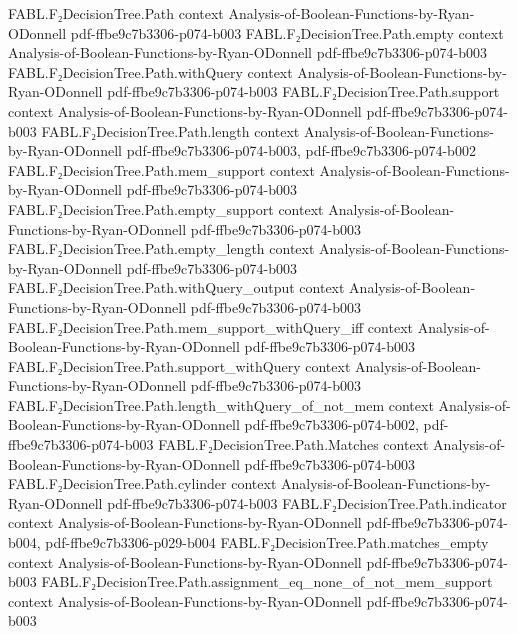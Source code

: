 \begin{theorem}
\proofstep
  {FABL.F₂DecisionTree.Path}
  {context}
  {Analysis-of-Boolean-Functions-by-Ryan-ODonnell}
  {pdf-ffbe9c7b3306-p074-b003}
\proofstep
  {FABL.F₂DecisionTree.Path.empty}
  {context}
  {Analysis-of-Boolean-Functions-by-Ryan-ODonnell}
  {pdf-ffbe9c7b3306-p074-b003}
\proofstep
  {FABL.F₂DecisionTree.Path.withQuery}
  {context}
  {Analysis-of-Boolean-Functions-by-Ryan-ODonnell}
  {pdf-ffbe9c7b3306-p074-b003}
\proofstep
  {FABL.F₂DecisionTree.Path.support}
  {context}
  {Analysis-of-Boolean-Functions-by-Ryan-ODonnell}
  {pdf-ffbe9c7b3306-p074-b003}
\proofstep
  {FABL.F₂DecisionTree.Path.length}
  {context}
  {Analysis-of-Boolean-Functions-by-Ryan-ODonnell}
  {pdf-ffbe9c7b3306-p074-b003,
    pdf-ffbe9c7b3306-p074-b002}
\proofstep
  {FABL.F₂DecisionTree.Path.mem_support}
  {context}
  {Analysis-of-Boolean-Functions-by-Ryan-ODonnell}
  {pdf-ffbe9c7b3306-p074-b003}
\proofstep
  {FABL.F₂DecisionTree.Path.empty_support}
  {context}
  {Analysis-of-Boolean-Functions-by-Ryan-ODonnell}
  {pdf-ffbe9c7b3306-p074-b003}
\proofstep
  {FABL.F₂DecisionTree.Path.empty_length}
  {context}
  {Analysis-of-Boolean-Functions-by-Ryan-ODonnell}
  {pdf-ffbe9c7b3306-p074-b003}
\proofstep
  {FABL.F₂DecisionTree.Path.withQuery_output}
  {context}
  {Analysis-of-Boolean-Functions-by-Ryan-ODonnell}
  {pdf-ffbe9c7b3306-p074-b003}
\proofstep
  {FABL.F₂DecisionTree.Path.mem_support_withQuery_iff}
  {context}
  {Analysis-of-Boolean-Functions-by-Ryan-ODonnell}
  {pdf-ffbe9c7b3306-p074-b003}
\proofstep
  {FABL.F₂DecisionTree.Path.support_withQuery}
  {context}
  {Analysis-of-Boolean-Functions-by-Ryan-ODonnell}
  {pdf-ffbe9c7b3306-p074-b003}
\proofstep
  {FABL.F₂DecisionTree.Path.length_withQuery_of_not_mem}
  {context}
  {Analysis-of-Boolean-Functions-by-Ryan-ODonnell}
  {pdf-ffbe9c7b3306-p074-b002,
    pdf-ffbe9c7b3306-p074-b003}
\proofstep
  {FABL.F₂DecisionTree.Path.Matches}
  {context}
  {Analysis-of-Boolean-Functions-by-Ryan-ODonnell}
  {pdf-ffbe9c7b3306-p074-b003}
\proofstep
  {FABL.F₂DecisionTree.Path.cylinder}
  {context}
  {Analysis-of-Boolean-Functions-by-Ryan-ODonnell}
  {pdf-ffbe9c7b3306-p074-b003}
\proofstep
  {FABL.F₂DecisionTree.Path.indicator}
  {context}
  {Analysis-of-Boolean-Functions-by-Ryan-ODonnell}
  {pdf-ffbe9c7b3306-p074-b004,
    pdf-ffbe9c7b3306-p029-b004}
\proofstep
  {FABL.F₂DecisionTree.Path.matches_empty}
  {context}
  {Analysis-of-Boolean-Functions-by-Ryan-ODonnell}
  {pdf-ffbe9c7b3306-p074-b003}
\proofstep
  {FABL.F₂DecisionTree.Path.assignment_eq_none_of_not_mem_support}
  {context}
  {Analysis-of-Boolean-Functions-by-Ryan-ODonnell}
  {pdf-ffbe9c7b3306-p074-b003}

\end{theorem}
